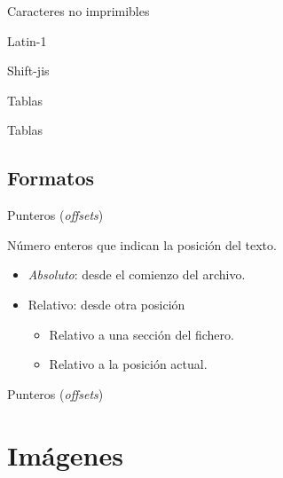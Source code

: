 \begin{frame}{Caracteres no imprimibles}
\end{frame}

\begin{frame}{Latin-1}
\end{frame}

\begin{frame}{Shift-jis}
\end{frame}

\begin{frame}{Tablas}
\end{frame}

\begin{frame}{Tablas}
\end{frame}

\subsection{Formatos}
\begin{frame}{Punteros (\textit{offsets})}
    \begin{block}{}
        \centering{}Número enteros que indican la posición del texto.
    \end{block}
    \vfill{}
    \begin{itemize}
        \item<3-> \textit{Absoluto}: desde el comienzo del archivo.
        \item<4-> Relativo: desde otra posición
        \begin{itemize}
            \item Relativo a una sección del fichero.
            \item Relativo a la posición actual.
        \end{itemize}
    \end{itemize}
\end{frame}

\begin{frame}{Punteros (\textit{offsets})}
\end{frame}

\section{Imágenes}
